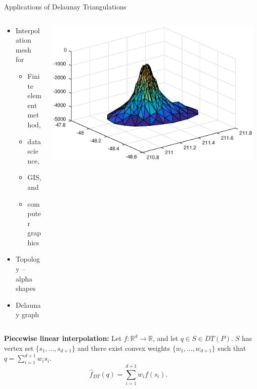 \documentclass[xcolor=dvipsnames]{beamer}
\begin{document}
\begin{frame}{Applications of Delaunay Triangulations}
\begin{columns}
\begin{column}{.48\textwidth}
\begin{itemize}
\item Interpolation mesh for
\begin{itemize}
\item Finite element method,
\item data science,
\item GIS, and
\item computer graphics
\end{itemize}
\item Topology -- alpha shapes
\item Delaunay graph
\end{itemize}
\end{column}
\begin{column}{.48\textwidth}
\hbox{\includegraphics[width=\textwidth]{seamount.eps}}
\end{column}
\end{columns}
\bigskip
\pause
{\bf Piecewise linear interpolation:}
Let $f : \mathbb{R}^d \rightarrow \mathbb{R}$, and let $q \in S \in DT(P)$.
$S$ has vertex set $\{s_1, \ldots, s_{d+1}\}$ and there exist convex weights
$\{w_1, \ldots, w_{d+1}\}$ such that $q = \sum_{i=1}^{d+1} w_i s_i$.
$$
{\hat f}_{DT}(q) = \sum_{i=1}^{d+1} w_i f(s_i).
$$
\end{frame}
\end{document}
